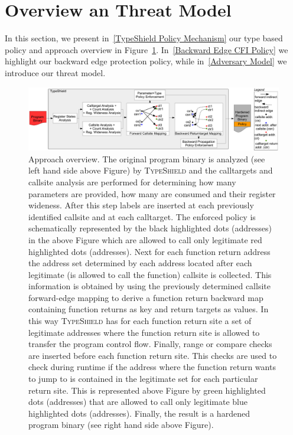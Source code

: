 \section{Overview an Threat Model}
\label{chapter:TypeShild Overview}
In this section, we present in~\cref{TypeShield Policy Mechanism} our type based policy and approach overview in Figure~\ref{System overview.}. 
In~\cref{Backward Edge CFI Policy} we highlight our backward edge protection policy, while  
in~\cref{Adversary Model} we introduce our threat model.

\begin{center}
\begin{figure}[t!]
\centering
   \includegraphics[width=.88\textwidth]{figures/overview.pdf}
    \caption{Approach overview.
    The original program binary is analyzed (see left hand side above Figure) by \textsc{TypeShield} and the calltargets and callsite analysis are performed for determining how many parameters are 
    provided, how many are consumed and their register wideness.
    After this step labels are inserted at each previously identified callsite and at each calltarget. 
    The enforced policy is schematically represented by the black highlighted dots (addresses) in the above Figure which are allowed to call only legitimate red highlighted dots (addresses).
    Next for each function return address the address set determined by each address located after each legitimate (is allowed to call the function) callsite is collected.
    This information is obtained by using the previously determined callsite forward-edge mapping to derive a function return backward map containing function returns as key and return targets as values.
    In this way \textsc{TypeShield} has for each function return site a set of legitimate addresses where the function return site is allowed to transfer the program control flow.
    Finally, range or compare checks are inserted before each function return site. This checks are used to check during runtime if the 
    address where the function return wants to jump to is contained in the legitimate set for each particular return site.
    This is represented above Figure by green highlighted dots (addresses) that are allowed to call only legitimate blue highlighted dots (addresses).
    Finally, the result is a hardened program binary (see right hand side above Figure).}
    \label{System overview.}
    \vspace{-.5cm}
 \end{figure}
\end{center}

